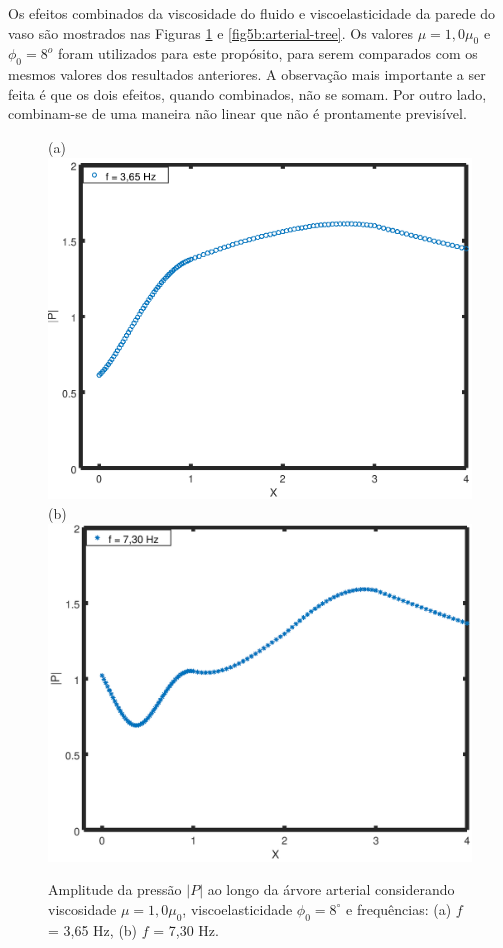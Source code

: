 \documentclass[
        english,			
        brazil			        %
        ,<...>]{abntbibufjf}
\begin{document}
Os efeitos combinados da viscosidade do fluido e viscoelasticidade da parede do vaso são mostrados nas Figuras \ref{fig5a:arterial-tree} e \ref{fig5b:arterial-tree}. Os valores $\mu = 1,0 \mu_0$ e $\phi_0 = 8^o$ foram utilizados para este propósito, para serem comparados com os mesmos valores dos resultados anteriores. A observação mais importante a ser feita é que os dois efeitos, quando combinados, não se somam. Por outro lado, combinam-se de uma maneira não linear que não é prontamente previsível.

\begin{figure}[!htbp]
	\centering
	(a) \\
	\includegraphics[scale=0.7]{figure5-result/Figure5_phi_den_f3_65_new.png}\\
	(b)\\
	\includegraphics[scale=0.7]{figure5-result/Figure5_phi_den_f7_30_new.png}\\
	\caption{Amplitude da pressão $|P|$ ao longo da árvore arterial considerando viscosidade $\mu = 1,0 \mu_0$, viscoelasticidade $\phi_0 = 8^{\circ}$ e frequências: (a) $f$ = 3,65 Hz, (b)  $f$ = 7,30 Hz. }
	\label{fig5a:arterial-tree}%
\end{figure}
\end{document}
